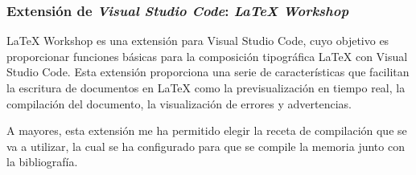 \subsubsection{Extensión de \textit{Visual Studio Code}: \textit{LaTeX Workshop}}

LaTeX Workshop es una extensión para Visual Studio Code, cuyo objetivo es proporcionar funciones básicas para la composición tipográfica LaTeX con Visual Studio Code. Esta extensión proporciona una serie de características que facilitan la escritura de documentos en LaTeX como la previsualización en tiempo real, la compilación del documento, la visualización de errores y advertencias.

A mayores, esta extensión me ha permitido elegir la receta de compilación que se va a utilizar, la cual se ha configurado para que se compile la memoria junto con la bibliografía.

